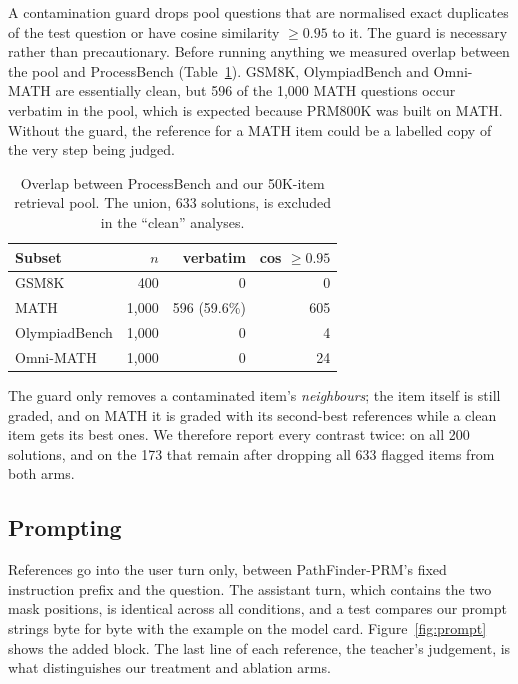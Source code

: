 \documentclass[11pt]{article}
\begin{document}
A contamination guard drops pool questions that are normalised exact duplicates of the test
question or have cosine similarity $\ge 0.95$ to it. The guard is necessary rather than
precautionary. Before running anything we measured overlap between the pool and ProcessBench
(Table~\ref{tab:contamination}). GSM8K, OlympiadBench and Omni-MATH are essentially clean, but
596 of the 1{,}000 MATH questions occur verbatim in the pool, which is expected because PRM800K
was built on MATH. Without the guard, the reference for a MATH item could be a labelled copy of
the very step being judged.

\begin{table}[t]
\centering
\small
\begin{tabular}{lrrr}
\toprule
Subset & $n$ & verbatim & cos $\ge 0.95$ \\
\midrule
GSM8K & 400 & 0 & 0 \\
MATH & 1{,}000 & 596 (59.6\%) & 605 \\
OlympiadBench & 1{,}000 & 0 & 4 \\
Omni-MATH & 1{,}000 & 0 & 24 \\
\bottomrule
\end{tabular}
\caption{Overlap between ProcessBench and our 50K-item retrieval pool. The union, 633
solutions, is excluded in the ``clean'' analyses.}
\label{tab:contamination}
\end{table}

The guard only removes a contaminated item's \emph{neighbours}; the item itself is still graded,
and on MATH it is graded with its second-best references while a clean item gets its best ones.
We therefore report every contrast twice: on all 200 solutions, and on the 173 that remain
after dropping all 633 flagged items from both arms.

\subsection{Prompting}

References go into the user turn only, between PathFinder-PRM's fixed instruction prefix and
the question. The assistant turn, which contains the two mask positions, is identical across
all conditions, and a test compares our prompt strings byte for byte with the example on the
model card. Figure~\ref{fig:prompt} shows the added block. The last line of each reference,
the teacher's judgement, is what distinguishes our treatment and ablation arms.
\end{document}
